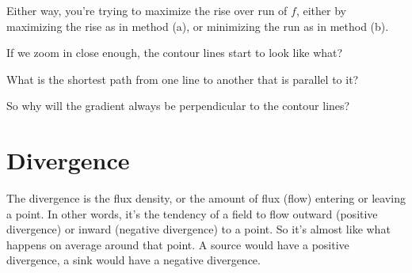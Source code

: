 \documentclass[11pt]{article}
\begin{document}
\begin{enumerate}
Either way, you're trying to maximize the rise over run of $f$, either by maximizing the rise as in method (a), or minimizing the run as in method (b).  

If we zoom in close enough, the contour lines start to look like what?

\vspace{1cm}

What is the shortest path from one line to another that is parallel to it?

\vspace{1cm}

So why will the gradient always be perpendicular to the contour lines?

\end{enumerate}
\newpage

\section*{Divergence}
The divergence is the flux density, or the amount of flux (flow) entering or leaving a point.  In other words, it's the tendency of a field to flow outward (positive divergence) or inward (negative divergence) to a point.  So it's almost like what happens on average around that point.  A source would have a positive divergence, a sink would have a negative divergence.
\end{document}
